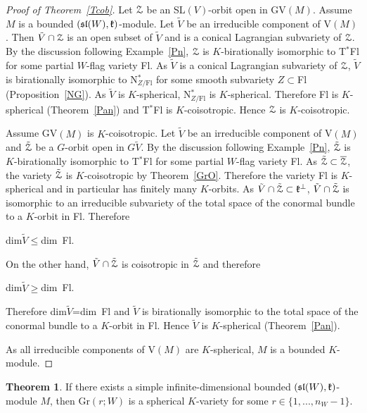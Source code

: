 \documentclass[12pt]{amsart}
\theoremstyle{definition}\newtheorem{theorem}{Theorem}[section]
\theoremstyle{definition}\newtheorem{definition}[proposition]{Definition}
\theoremstyle{remark}\newtheorem{example}[proposition]{Example}
\begin{document}
\begin{proof}[Proof of Theorem~\ref{Tcob}]Let $\EuScript Z$ be an SL$(V)$-orbit open in GV$(M)$. Assume $M$ is a bounded $(\frak{sl}(W), \frak k)$-module. Let $\tilde V$ be an irreducible component of V$(M)$. Then $\tilde V\cap\EuScript Z$ is an open subset of $\tilde V$ and is a conical Lagrangian subvariety of $\EuScript Z$. By the discussion following Example~\ref{Pn}, $\EuScript Z$ is $K$-birationally isomorphic to T$^*$Fl for some partial $W$-flag variety Fl. As $\tilde V$ is a conical Lagrangian subvariety of $\EuScript Z$, $\tilde V$ is birationally isomorphic to N$^*_{Z/\mathrm{Fl}}$ for some smooth subvariety $Z\subset$Fl (Proposition~\ref{NG}). As $\tilde V$ is $K$-spherical, N$^*_{Z/\mathrm{Fl}}$ is $K$-spherical. Therefore Fl is $K$-spherical (Theorem~\ref{Pan}) and T$^*$Fl is $K$-coisotropic. Hence $\EuScript Z$ is $K$-coisotropic.

Assume GV$(M)$ is $K$-coisotropic. Let $\tilde V$ be an irreducible component of V$(M)$ and $\tilde{\EuScript Z}$ be a $G$-orbit open in $G\tilde V$. By the discussion following Example~\ref{Pn}, $\tilde{\EuScript Z}$ is $K$-birationally isomorphic to T$^*$Fl for some partial $W$-flag variety Fl. As $\tilde{\EuScript Z}\subset\overline{\EuScript Z}$, the variety $\tilde{\EuScript Z}$ is $K$-coisotropic by Theorem~\ref{GrO}. Therefore the variety Fl is $K$-spherical and in particular has finitely many $K$-orbits. As $\tilde V\cap\tilde{\EuScript Z}\subset\frak k^\bot$, $\tilde V\cap\tilde{\EuScript Z}$ is isomorphic to an irreducible subvariety of the total space of the conormal bundle to a $K$-orbit in Fl. Therefore \begin{center}dim$\tilde V\le$dim~Fl.\end{center} On the other hand, $\tilde V\cap\tilde{\EuScript Z}$ is coisotropic in $\tilde{\EuScript Z}$ and therefore \begin{center}dim$\tilde V\ge$dim~Fl.\end{center} Therefore dim$\tilde V$=dim~Fl and $\tilde V$ is birationally isomorphic to the total space of the conormal bundle to a $K$-orbit in Fl. Hence $\tilde V$ is $K$-spherical (Theorem~\ref{Pan}).

As all irreducible components of V$(M)$ are $K$-spherical, $M$ is a bounded $K$-module.\end{proof}
\begin{theorem}\label{M_to_Gr} If there exists a simple infinite-dimensional bounded $(\frak{sl}(W), \frak k)$-module $M$, then $\mathrm{Gr}(r; W)$ is a spherical $K$-variety for some $r\in\{1,..., n_W-1\}$.\end{theorem}
\end{document}
